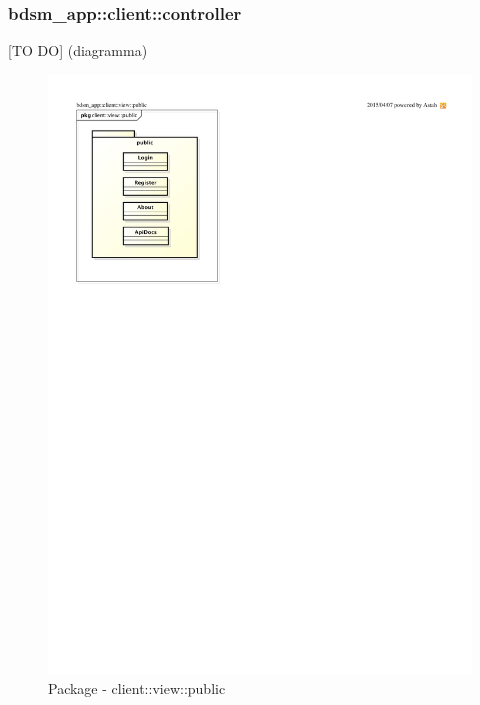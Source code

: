 %


\subsubsection{bdsm\_app::client::controller} %
\label{ssub:bdsm_app_client_controller}
[TO DO] (diagramma) \newline \newline
\begin{figure}[htbp]
	\centering
	\centerline{\includegraphics[scale=0.6]{./images/client_view_public.pdf}}
	\caption{Package - client::view::public}
\end{figure}


